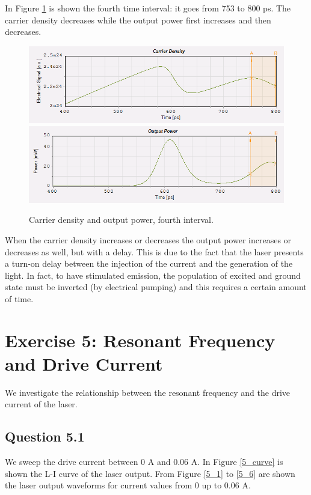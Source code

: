 \documentclass[a4paper,10pt]{report}
\begin{document}
In Figure \ref{4_4} is shown the fourth time interval: it goes from 753 to 800 ps.
The carrier density decreases while the output power first increases and then decreases.
\begin{figure}[!ht]
  \centering
  \includegraphics[width=12cm]{4_4cd.png}\\
  \includegraphics[width=12cm]{4_4pw.png}\\
  \caption{Carrier density and output power, fourth interval.}
  \label{4_4}
\end{figure}

When the carrier density increases or decreases the output power increases or decreases as well, but with a delay.
This is due to the fact that the laser presents a turn-on delay between the injection of the current and the generation of the light.
In fact, to have stimulated emission, the population of excited and ground state must be inverted (by electrical pumping) and this
requires a certain amount of time.


\newpage
\section*{Exercise 5: Resonant Frequency and Drive Current}
We investigate the relationship between the resonant frequency and the drive current of the laser.

\subsection*{Question 5.1}
We sweep the drive current between 0 A and 0.06 A.
In Figure \ref{5_curve} is shown the L-I curve of the laser output. From Figure \ref{5_1} to \ref{5_6} are shown the laser output waveforms
for current values from 0 up to 0.06 A.
\end{document}
